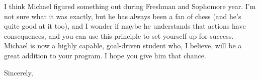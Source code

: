 \documentclass[11pt, letterpaper]{letter} %
\begin{document}
\begin{letter}
I think Michael figured something out during Freshman and Sophomore year. I'm not sure what it was exactly, but he has always been a fan of chess (and he's quite good at it too), and I wonder if maybe he understands that actions have consequences, and you can use this principle to set yourself up for success. Michael is now a highly capable, goal-driven student who, I believe, will be a great addition to your program. I hope you give him that chance.

\closing{Sincerely,}




\end{letter}
\end{document}
